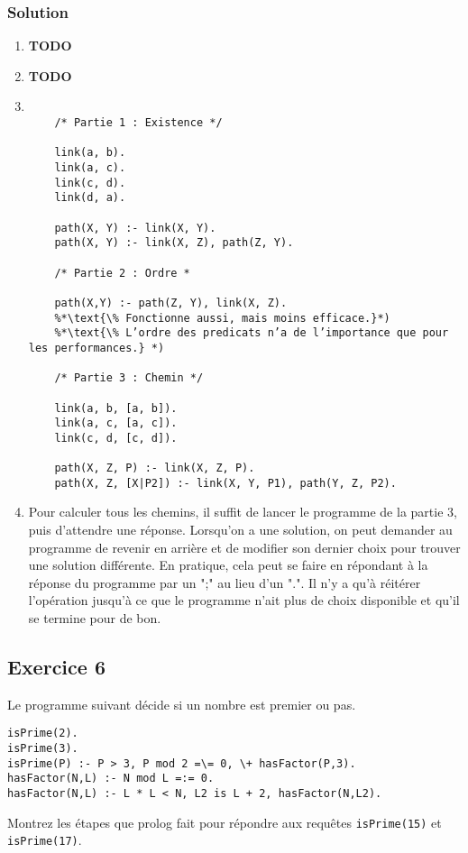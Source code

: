     \subsubsection*{Solution}
    \begin{enumerate}
    \item \textbf{TODO}
    \item \textbf{TODO}
    \item
    \begin{lstlisting}

    /* Partie 1 : Existence */

    link(a, b).
    link(a, c).
    link(c, d).
    link(d, a).

    path(X, Y) :- link(X, Y).
    path(X, Y) :- link(X, Z), path(Z, Y).

    /* Partie 2 : Ordre *

    path(X,Y) :- path(Z, Y), link(X, Z).
    %*\text{\% Fonctionne aussi, mais moins efficace.}*)
    %*\text{\% L’ordre des predicats n’a de l’importance que pour les performances.} *)

    /* Partie 3 : Chemin */

    link(a, b, [a, b]).
    link(a, c, [a, c]).
    link(c, d, [c, d]).

    path(X, Z, P) :- link(X, Z, P).
    path(X, Z, [X|P2]) :- link(X, Y, P1), path(Y, Z, P2).
    \end{lstlisting}

    \item Pour calculer tous les chemins, il suffit de lancer le programme de la partie 3, puis d'attendre une réponse.
    Lorsqu'on a une solution, on peut demander au programme de revenir en arrière et de modifier son dernier choix pour trouver une solution différente.
    En pratique, cela peut se faire en répondant à la réponse du programme par un ";" au lieu d'un ".".
    Il n'y a qu'à réitérer l'opération jusqu'à ce que le programme n'ait plus de choix disponible et qu'il se termine pour de bon.

   \end{enumerate}
\subsection*{Exercice 6}
Le programme suivant d\'{e}cide si un nombre est premier ou pas.

\begin{verbatim}
isPrime(2).
isPrime(3).
isPrime(P) :- P > 3, P mod 2 =\= 0, \+ hasFactor(P,3).
hasFactor(N,L) :- N mod L =:= 0.
hasFactor(N,L) :- L * L < N, L2 is L + 2, hasFactor(N,L2).
\end{verbatim}
Montrez les \'{e}tapes que prolog fait pour r\'{e}pondre aux requ\^{e}tes \texttt{isPrime(15)} et \texttt{isPrime(17)}.

